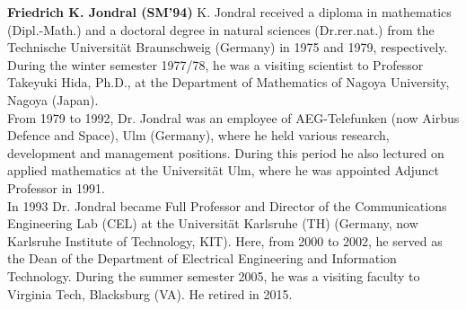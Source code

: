 \documentclass[journal, twocolumn]{IEEEtran}
\begin{document}
\begin{IEEEbiography}
{\textbf{Friedrich K. Jondral (SM'94)}} K. Jondral received a diploma in mathematics (Dipl.-Math.) and a doctoral degree in natural sciences (Dr.rer.nat.) from the Technische Universität Braunschweig (Germany) in 1975 and 1979, respectively. During the winter semester 1977/78, he was a visiting scientist to Professor Takeyuki Hida, Ph.D., at the Department of Mathematics of Nagoya University, Nagoya (Japan). \\
From 1979 to 1992, Dr. Jondral was an employee of AEG-Telefunken (now Airbus Defence and Space), Ulm (Germany), where he held various research, development and management positions. During this period he also lectured on applied mathematics at the Universität Ulm, where he was appointed Adjunct Professor in 1991. \\
In 1993 Dr. Jondral became Full Professor and Director of the Communications Engineering Lab (CEL) at the Universität Karlsruhe (TH) (Germany, now Karlsruhe Institute of Technology, KIT). Here, from 2000 to 2002, he served as the Dean of the Department of Electrical Engineering and Information Technology. During the summer semester 2005, he was a visiting faculty to Virginia Tech, Blacksburg (VA). He retired in 2015. 
\end{IEEEbiography}

\end{document}
